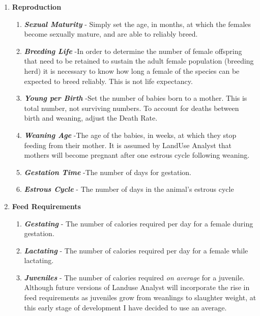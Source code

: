\begin{enumerate}
    \item \textbf{Reproduction}
      \begin{enumerate}
        \item  \textit{\textbf{Sexual Maturity}} - Simply set the age, in
months, at which the females become sexually mature, and are able to reliably
breed.
        \item  \textit\textbf{{Breeding Life}} -In order to determine the number
of female offspring that need to be retained to sustain the adult female
population (breeding herd) it is necessary to know how long a female of the
species can be expected to breed reliably. This is not life expectancy. 
        \item  \textit{\textbf{Young per Birth}} -Set the number of babies born
to a mother. This is total number, not surviving numbers. To account for deaths
between birth and weaning, adjust the Death Rate. 
        \item  \textit{\textbf{Weaning Age}} -The age of the babies, in weeks,
at which they stop feeding from their mother. It is assumed by LandUse Analyst
that mothers will become pregnant after one estrous cycle following weaning. 
        \item  \textit{\textbf{Gestation Time}} -The number of days for
gestation. 
        \item  \textit{\textbf{Estrous Cycle}} - The number of days in the
animal's estrous cycle

      \end{enumerate}

    \item \textbf{Feed Requirements}
      \begin{enumerate}
        \item  \textit{\textbf{Gestating}} - The number of calories required per
day for a female during gestation.
        \item  \textit{\textbf{Lactating}} - The number of calories required per
day for a female while lactating.
        \item  \textit{\textbf{Juveniles}} - The number of calories required
\textit{on average} for a juvenile.  Although future versions of Landuse Analyst
will incorporate the rise in feed requirements as juveniles grow from weanlings
to slaughter weight, at this early stage of development I have decided to use an
average.
      \end{enumerate}
  \end{enumerate}

